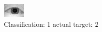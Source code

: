 \begin{figure}[h!]
\begin{center}
\includegraphics[width=0.60\columnwidth]{figures/ID916_class_1_target_2.png}
\end{center}
\caption{ Classification: 1 actual target: 2}
\label{fig:ID916_class_1_target_2}
\end{figure}
